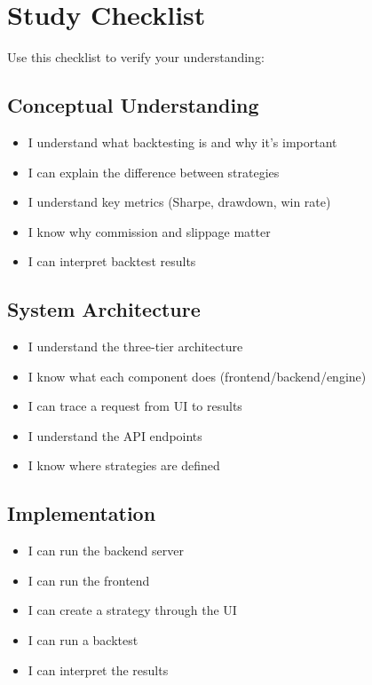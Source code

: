 \documentclass[11pt,a4paper]{article}
\begin{document}
\section{Study Checklist}

Use this checklist to verify your understanding:

\subsection{Conceptual Understanding}
\begin{itemize}
  \item[$\square$] I understand what backtesting is and why it's important
  \item[$\square$] I can explain the difference between strategies
  \item[$\square$] I understand key metrics (Sharpe, drawdown, win rate)
  \item[$\square$] I know why commission and slippage matter
  \item[$\square$] I can interpret backtest results
\end{itemize}

\subsection{System Architecture}
\begin{itemize}
  \item[$\square$] I understand the three-tier architecture
  \item[$\square$] I know what each component does (frontend/backend/engine)
  \item[$\square$] I can trace a request from UI to results
  \item[$\square$] I understand the API endpoints
  \item[$\square$] I know where strategies are defined
\end{itemize}

\subsection{Implementation}
\begin{itemize}
  \item[$\square$] I can run the backend server
  \item[$\square$] I can run the frontend
  \item[$\square$] I can create a strategy through the UI
  \item[$\square$] I can run a backtest
  \item[$\square$] I can interpret the results
\end{itemize}
\end{document}
